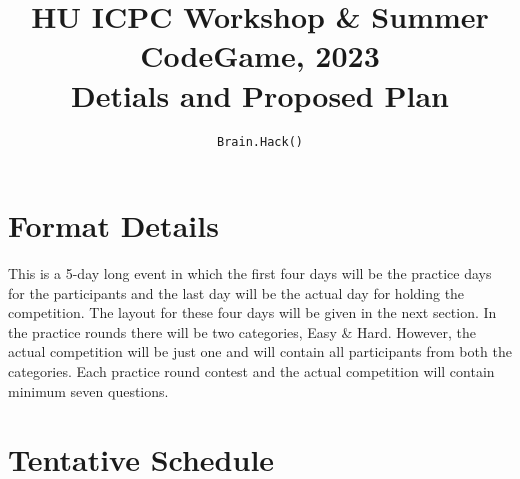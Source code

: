 \documentclass[12pt]{article}
\title{HU ICPC Workshop \& Summer CodeGame, 2023 \\ Detials and Proposed Plan}
\author{\texttt{Brain.Hack()}}
\date{}
\begin{document}
\maketitle
\pagebreak

\section*{\centering Format Details}
This is a 5-day long event in which the first four days will be the practice days for the participants and the last day will be the actual day for holding the competition. The layout for these four days will be given in the next section. In the practice rounds there will be two categories, Easy \& Hard. However, the actual competition will be just one and will contain all participants from both the categories. Each practice round contest and the actual competition will contain minimum seven questions.

\section*{\centering Tentative Schedule}
\end{document}
